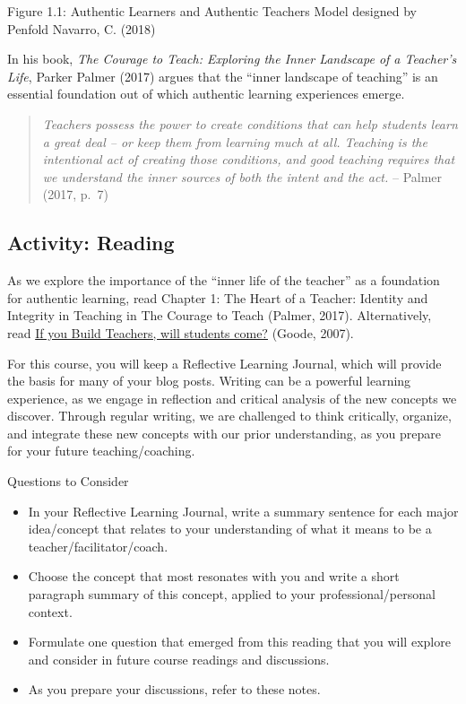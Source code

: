 \documentclass[
]{book}
\providecommand{\tightlist}{%
  \setlength{\itemsep}{0pt}\setlength{\parskip}{0pt}}
\begin{document}
Figure 1.1: Authentic Learners and Authentic Teachers Model designed by Penfold Navarro, C. (2018)

In his book, \emph{The Courage to Teach: Exploring the Inner Landscape of a Teacher's Life}, Parker Palmer (2017) argues that the ``inner landscape of teaching'' is an essential foundation out of which authentic learning experiences emerge.

\begin{quote}
\emph{Teachers possess the power to create conditions that can help students learn a great deal -- or keep them from learning much at all. Teaching is the intentional act of creating those conditions, and good teaching requires that we understand the inner sources of both the intent and the act.} -- Palmer (2017, p.~7)
\end{quote}

\hypertarget{activity-reading}{%
\subsection*{Activity: Reading}\label{activity-reading}}

\begin{reflect}
As we explore the importance of the ``inner life of the teacher'' as a foundation for authentic learning, read Chapter 1: The Heart of a Teacher: Identity and Integrity in Teaching in The Courage to Teach (Palmer, 2017). Alternatively, read \href{https://journals-sagepub-com.twu.idm.oclc.org/doi/pdf/10.2190/2102-5G77-QL77-5506}{If you Build Teachers, will students come?} (Goode, 2007).

For this course, you will keep a Reflective Learning Journal, which will provide the basis for many of your blog posts. Writing can be a powerful learning experience, as we engage in reflection and critical analysis of the new concepts we discover. Through regular writing, we are challenged to think critically, organize, and integrate these new concepts with our prior understanding, as you prepare for your future teaching/coaching.

{Questions to Consider}

\begin{itemize}
\tightlist
\item
  In your Reflective Learning Journal, write a summary sentence for each major idea/concept that relates to your understanding of what it means to be a teacher/facilitator/coach.\\
\item
  Choose the concept that most resonates with you and write a short paragraph summary of this concept, applied to your professional/personal context.\\
\item
  Formulate one question that emerged from this reading that you will explore and consider in future course readings and discussions.\\
\item
  As you prepare your discussions, refer to these notes.
\end{itemize}
\end{reflect}
\end{document}
